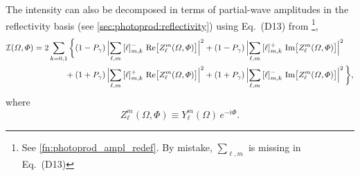 The intensity can also be decomposed in terms of partial-wave
amplitudes in the reflectivity basis (see
\cref{sec:photoprod:reflectivity}) using Eq.~(D13) from
\footnote{See \cref{fn:photoprod_ampl_redef}.
By mistake, $\sum_{\ell, m}$ is missing in Eq.~(D13)}, \ie
\begin{equation}
  \label{eq:zlm_photoprod}
  \begin{aligned}
  \intensity(\Omega, \Phi)
  = 2 \sum_{k = 0, 1} \bigg\{
         &(1 - P_\gamma)\, \Abs[2]{\sum_{\ell, m}\, [\ell]_{m, k}^{-}\, \Re[1]{Z_\ell^m(\Omega, \Phi)}}^2
      +   (1 - P_\gamma)\, \Abs[2]{\sum_{\ell, m}\, [\ell]_{m, k}^{+}\, \Im[1]{Z_\ell^m(\Omega, \Phi)}}^2
    \\
    {}+{}&(1 + P_\gamma)\, \Abs[2]{\sum_{\ell, m}\, [\ell]_{m, k}^{+}\, \Re[1]{Z_\ell^m(\Omega, \Phi)}}^2
      +   (1 + P_\gamma)\, \Abs[2]{\sum_{\ell, m}\, [\ell]_{m, k}^{-}\, \Im[1]{Z_\ell^m(\Omega, \Phi)}}^2
    \bigg\},
  \end{aligned}
\end{equation}
where
\begin{equation}
  Z_\ell^m(\Omega, \Phi)
  \equiv Y_\ell^m(\Omega)\, e^{-i \Phi}.
\end{equation}

